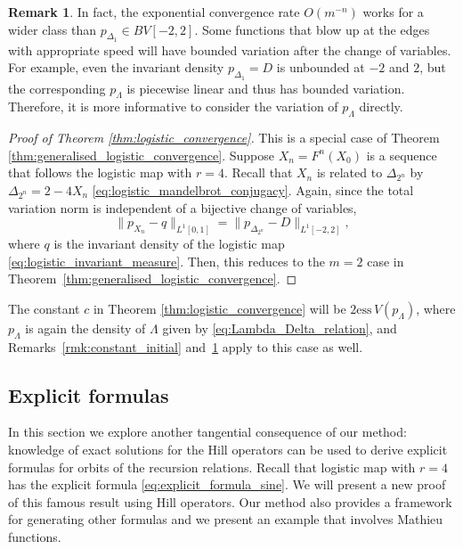 \documentclass[a4paper]{article}
\theoremstyle{definition}
\newtheorem{remark}[theorem]{Remark}%
\numberwithin{equation}{section}
\numberwithin{theorem}{section}
\newcommand{\ess}{\mathrm{ess}\,}
\begin{document}
{\begin{remark} \label{rmk:exponential_conv}
    In fact, the exponential convergence rate $O(m^{-n})$ works for a wider class than $p_{\Delta_1}\in BV[-2,2]$. Some functions that blow up at the edges with appropriate speed will have bounded variation after the change of variables. For example, even the invariant density $p_{\Delta_1}=D$ is unbounded at $-2$ and $2$, but the corresponding $p_\Lambda$ is piecewise linear and thus has bounded variation. Therefore, it is more informative to consider the variation of $p_\Lambda$ directly.
\end{remark}

\begin{proof}[Proof of Theorem \ref{thm:logistic_convergence}]
    This is a special case of Theorem \ref{thm:generalised_logistic_convergence}. Suppose $X_n = F^n(X_0)$ is a sequence that follows the logistic map with $r=4$. Recall that $X_n$ is related to $\Delta_{2^n}$ by $\Delta_{2^n} = 2-4X_n$ \eqref{eq:logistic_mandelbrot_conjugacy}. Again, since the total variation norm is independent of a bijective change of variables, 
    \begin{equation*}
        \lVert p_{X_n}-q\rVert_{L^1[0,1]} = \lVert p_{\Delta_{2^n}} - D\rVert_{L^1[-2,2]},
    \end{equation*}
    where $q$ is the invariant density of the logistic map \eqref{eq:logistic_invariant_measure}. Then, this reduces to the $m=2$ case in Theorem~\ref{thm:generalised_logistic_convergence}.
\end{proof}

The constant $c$ in Theorem \ref{thm:logistic_convergence} will be $2 \ess V(p_\Lambda)$, where $p_\Lambda$ is again the density of $\Lambda$ given by \eqref{eq:Lambda_Delta_relation}, and Remarks~\ref{rmk:constant_initial} and~\ref{rmk:exponential_conv} apply to this case as well.

\subsection{Explicit formulas} \label{sec:explicit_formulas}
In this section we explore another tangential consequence of our method: knowledge of exact solutions for the Hill operators can be used to derive explicit formulas for orbits of the recursion relations. Recall that logistic map with $r=4$ has the explicit formula \eqref{eq:explicit_formula_sine}. We will present a new proof of this famous result using Hill operators. Our method also provides a framework for generating other formulas and we present an example that involves Mathieu functions.

}
\end{document}
